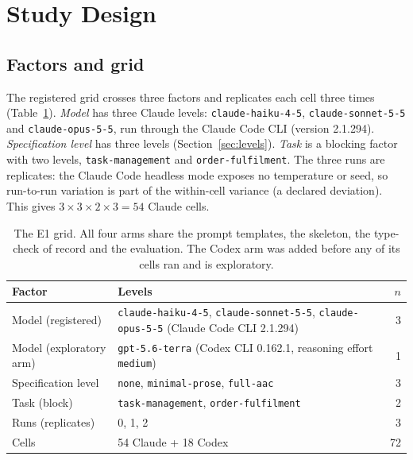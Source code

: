 \documentclass[10pt,a4paper]{article}
\newcommand{\lev}[1]{\texttt{\small #1}}
\begin{document}
\section{Study Design}\label{sec:design}

\subsection{Factors and grid}

The registered grid crosses three factors and replicates each cell three times
(Table~\ref{tab:grid}). %
\emph{Model} has three Claude levels: \texttt{claude-haiku-4-5}, \texttt{claude-sonnet-5-5} and
\texttt{claude-opus-5-5}, run through the Claude Code CLI (version 2.1.294).
\emph{Specification level} has three levels (Section~\ref{sec:levels}). \emph{Task} is a blocking factor with two
levels, \texttt{task-management} and \texttt{order-fulfilment}. The three runs are replicates: the Claude Code
headless mode exposes no temperature or seed, so run-to-run variation is part of the within-cell variance
(a declared deviation). %
This gives $3 \times 3 \times 2 \times 3 = 54$ Claude cells. %

\begin{table}[t]
\centering\small
\caption{The E1 grid. All four arms share the prompt templates, the skeleton, the type-check of record and the
evaluation. The Codex arm was added before any of its cells ran and is exploratory.}
\label{tab:grid}
\begin{tabularx}{\linewidth}{@{}lXr@{}}
\toprule
Factor & Levels & $n$ \\
\midrule
Model (registered) & \texttt{claude-haiku-4-5}, \texttt{claude-sonnet-5-5}, \texttt{claude-opus-5-5} (Claude Code CLI 2.1.294) & 3 \\
Model (exploratory arm) & \texttt{gpt-5.6-terra} (Codex CLI 0.162.1, reasoning effort \texttt{medium}) & 1 \\
Specification level & \lev{none}, \lev{minimal-prose}, \lev{full-aac} & 3 \\
Task (block) & \texttt{task-management}, \texttt{order-fulfilment} & 2 \\
Runs (replicates) & 0, 1, 2 & 3 \\
\midrule
Cells & 54 Claude + 18 Codex & 72 \\
\bottomrule
\end{tabularx}
\end{table}
\end{document}
